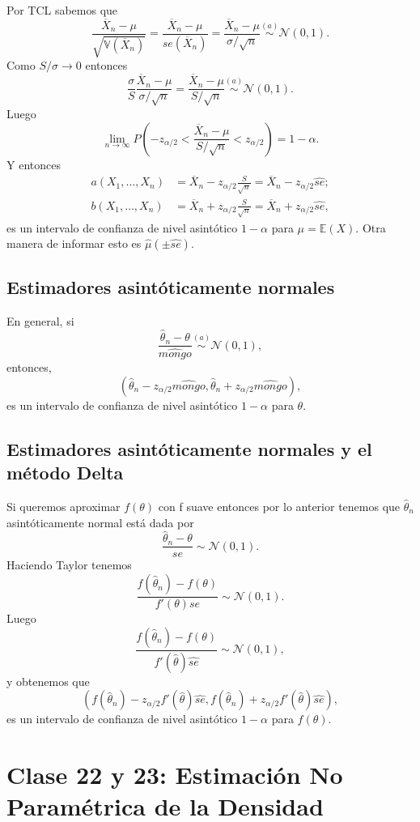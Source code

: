 \documentclass[a4paper,12pt]{article}
\theoremstyle{definition}
\numberwithin{prop}{section}
\theoremstyle{remark}
\numberwithin{ej_subseccion}{subsection}
\begin{document}
	Por TCL sabemos que
	$$\frac{\overline{X}_n-\mu}{\sqrt{\mathbb{V}(\overline{X}_n)}}=\frac{\overline{X}_n-\mu}{se(\overline{X}_n)}=\frac{\overline{X}_n-\mu}{\sigma/\sqrt{n}}\overset{(a)}{\sim}\mathcal{N}(0,1).$$
	Como $S/\sigma\to 0$ entonces
	$$\frac{\sigma}{S}\frac{\overline{X}_n-\mu}{\sigma/\sqrt{n}}=\frac{\overline{X}_n-\mu}{S/\sqrt{n}}\overset{(a)}{\sim}\mathcal{N}(0,1).$$
	Luego
	$$\lim_{n\to\infty}P(-z_{\alpha/2}<\frac{\overline{X}_n-\mu}{S/\sqrt{n}}<z_{\alpha/2})=1-\alpha.$$
	Y entonces
	\begin{align*}
	a(X_1,\dots,X_n)&=\overline{X}_n-z_{\alpha/2}\frac{S}{\sqrt{n}}=\overline{X}_n-z_{\alpha/2}\hat{se};\\ b(X_1,\dots,X_n)&=\overline{X}_n+z_{\alpha/2}\frac{S}{\sqrt{n}}=\overline{X}_n+z_{\alpha/2}\hat{se},
	\end{align*}
	es un intervalo de confianza de nivel asintótico $1-\alpha$ para $\mu=\mathbb{E}(X)$. Otra manera de informar esto es $\hat{\mu}(\pm\hat{se})$.
	
	\subsection*{Estimadores asintóticamente normales}
	
	En general, si
	$$\frac{\hat{\theta}_n-\theta}{\widehat{mongo}}\overset{(a)}{\sim}\mathcal{N}(0,1),$$
	entonces,
	$$(\hat{\theta}_n-z_{\alpha/2}\widehat{mongo},\hat{\theta}_n+z_{\alpha/2}\widehat{mongo}),$$
	es un intervalo de confianza de nivel asintótico $1-\alpha$ para $\theta$.
	
	\subsection*{Estimadores asintóticamente normales y el método Delta}
	
	Si queremos aproximar $f(\theta)$ con f suave entonces por lo anterior tenemos que $\hat{\theta}_n$ asintóticamente normal está dada por
	$$\frac{\hat{\theta}_n-\theta}{se}\sim\mathcal{N}(0,1).$$
	Haciendo Taylor tenemos
	$$\frac{f(\hat{\theta}_n)-f(\theta)}{f'(\theta)se}\sim\mathcal{N}(0,1).$$
	Luego
	$$\frac{f(\hat{\theta}_n)-f(\theta)}{f'(\hat{\theta})\hat{se}}\sim\mathcal{N}(0,1),$$
	y obtenemos que
	$$(f(\hat{\theta}_n)-z_{\alpha/2}f'(\hat{\theta})\hat{se},f(\hat{\theta}_n)+z_{\alpha/2}f'(\hat{\theta})\hat{se}),$$
	es un intervalo de confianza de nivel asintótico $1-\alpha$ para $f(\theta)$.
	
	\section*{Clase 22 y 23: Estimación No Paramétrica de la Densidad}
\end{document}
